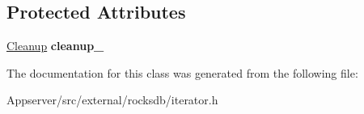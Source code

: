 \subsection*{Protected Attributes}
\begin{DoxyCompactItemize}
\item 
\hyperlink{structrocksdb_1_1Cleanable_1_1Cleanup}{Cleanup} {\bfseries cleanup\+\_\+}\hypertarget{classrocksdb_1_1Cleanable_ab874a5c66ee637057de636b53c1883c0}{}\label{classrocksdb_1_1Cleanable_ab874a5c66ee637057de636b53c1883c0}

\end{DoxyCompactItemize}


The documentation for this class was generated from the following file\+:\begin{DoxyCompactItemize}
\item 
Appserver/src/external/rocksdb/iterator.\+h\end{DoxyCompactItemize}
